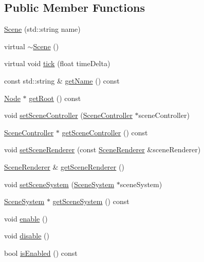 \subsection*{Public Member Functions}
\begin{DoxyCompactItemize}
\item 
\mbox{\hyperlink{classec_1_1_scene_a9abac0a0de42ff4e9eb6481cf1927754}{Scene}} (std\+::string name)
\item 
virtual \mbox{\hyperlink{classec_1_1_scene_a25e849d1bd5a9a71af922c3668115cb6}{$\sim$\+Scene}} ()
\item 
virtual void \mbox{\hyperlink{classec_1_1_scene_a09deb945a2c8255d70a68b0aaddaecb6}{tick}} (float time\+Delta)
\item 
const std\+::string \& \mbox{\hyperlink{classec_1_1_scene_a24c00d38f3b17123f10f02ff77830f62}{get\+Name}} () const
\item 
\mbox{\hyperlink{classec_1_1_node}{Node}} $\ast$ \mbox{\hyperlink{classec_1_1_scene_aef77276f4a386c5b66159ecb1d4d072c}{get\+Root}} () const
\item 
void \mbox{\hyperlink{classec_1_1_scene_a8c3bc6848957704f9f45508c13133a91}{set\+Scene\+Controller}} (\mbox{\hyperlink{classec_1_1_scene_controller}{Scene\+Controller}} $\ast$scene\+Controller)
\item 
\mbox{\hyperlink{classec_1_1_scene_controller}{Scene\+Controller}} $\ast$ \mbox{\hyperlink{classec_1_1_scene_ad562a16db4552e529af7284de0b79304}{get\+Scene\+Controller}} () const
\item 
void \mbox{\hyperlink{classec_1_1_scene_a4a000b3820dfcf578ed80bae3bf5f432}{set\+Scene\+Renderer}} (const \mbox{\hyperlink{classec_1_1_scene_renderer}{Scene\+Renderer}} \&scene\+Renderer)
\item 
\mbox{\hyperlink{classec_1_1_scene_renderer}{Scene\+Renderer}} \& \mbox{\hyperlink{classec_1_1_scene_a73f48395e9442f3e6647dd9503050b91}{get\+Scene\+Renderer}} ()
\item 
void \mbox{\hyperlink{classec_1_1_scene_a87a6277fea206956c0a7175cf308ece0}{set\+Scene\+System}} (\mbox{\hyperlink{classec_1_1_scene_system}{Scene\+System}} $\ast$scene\+System)
\item 
\mbox{\hyperlink{classec_1_1_scene_system}{Scene\+System}} $\ast$ \mbox{\hyperlink{classec_1_1_scene_a95b79ca1dc856cb50262ab4b9e72465f}{get\+Scene\+System}} () const
\item 
void \mbox{\hyperlink{classec_1_1_scene_ab1788ac3be0db2d82ee2f8c5fa0cecef}{enable}} ()
\item 
void \mbox{\hyperlink{classec_1_1_scene_a05bf59f23abb809000ad17bdb00cab94}{disable}} ()
\item 
bool \mbox{\hyperlink{classec_1_1_scene_a0748d645ee5204e64d674c1b10b26864}{is\+Enabled}} () const
\end{DoxyCompactItemize}
